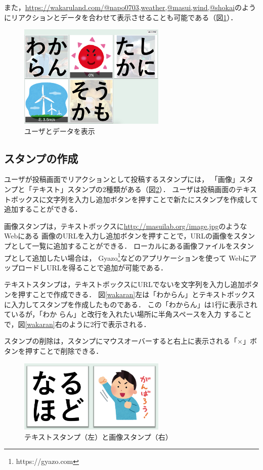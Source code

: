 また，\url{https://wakaruland.com/@napo0703,weather,@masui,wind,@shokai}のようにリアクションとデータを合わせて表示させることも可能である（図\ref{n_w_m_w_s}）．

\begin{figure}[h]
\centering
\includegraphics[width=7cm]{images/n_w_m_w_s.png}
\caption{ユーザとデータを表示}
\label{n_w_m_w_s}
\end{figure}

\subsection{スタンプの作成}
ユーザが投稿画面でリアクションとして投稿するスタンプには，
「画像」スタンプと「テキスト」スタンプの2種類がある（図\ref{stamp}）．
ユーザは投稿画面のテキストボックスに文字列を入力し追加ボタンを押すことで新たにスタンプを作成して追加することができる．

画像スタンプは，テキストボックスに\url{http://masuilab.org/image.jpg}のようなWebにある
画像のURLを入力し追加ボタンを押すことで，URLの画像をスタンプとして一覧に追加することができる．
ローカルにある画像ファイルをスタンプとして追加したい場合は，
Gyazo\footnote{https://gyazo.com}などのアプリケーションを使って
WebにアップロードしURLを得ることで追加が可能である．

テキストスタンプは，テキストボックスにURLでないを文字列を入力し追加ボタンを押すことで作成できる．
図\ref{wakaran}左は「わからん」とテキストボックスに入力してスタンプを作成したものである．
この「わからん」は1行に表示されているが，「わか らん」と改行を入れたい場所に半角スペースを入力
することで，図\ref{wakaran}右のように2行で表示される．

スタンプの削除は，スタンプにマウスオーバーすると右上に表示される「×」ボタンを押すことで削除できる．

\begin{figure}[h]
\centering
\includegraphics[width=7cm]{images/stamp.png}
\caption{テキストスタンプ（左）と画像スタンプ（右）}
\label{stamp}
\end{figure}

